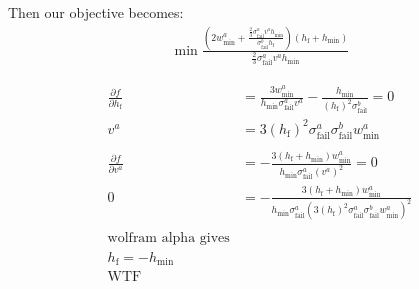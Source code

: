 \newpage
Then our objective becomes:
\begin{align*}
	\min{ \frac{\left( 2 w_\text{min}^a + \frac{\frac23 \sigma^a_\text{fail}v^a h_\text{min}}{\sigma^b_\text{fail}  h_\text{f}} \right) \left( h_\text{f} + h_\text{min} \right) }{ \frac23 \sigma^a_\text{fail}v^a h_\text{min} } }
\end{align*}

\begin{align*}
	\frac{\partial f}{\partial h_\text{f}} &= \frac{3 w_\text{min}^a}{h_\text{min} \sigma_\text{fail}^a v^a} - \frac{h_\text{min}}{\left(h_\text{f}\right)^2 \sigma_\text{fail}^b} = 0 \\
	v^a &= 3 \left(h_\text{f}\right)^2 \sigma_\text{fail}^a \sigma_\text{fail}^b  w_\text{min}^a  \\
	\\
	\frac{\partial f}{\partial v^a} &= - \frac{3 \left(h_\text{f} + h_\text{min}\right) w_\text{min}^a}{h_\text{min} \sigma^a_\text{fail} \left(v^a\right)^2} = 0\\
	0 &= - \frac{3 \left(h_\text{f} + h_\text{min}\right) w_\text{min}^a}{h_\text{min} \sigma^a_\text{fail} \left(  3 \left(h_\text{f}\right)^2 \sigma_\text{fail}^a \sigma_\text{fail}^b  w_\text{min}^a  \right)^2} \\
	\\
	\text{wolfram alpha gives} \\
	h_\text{f} = - h_\text{min} \\
	\text{WTF}
\end{align*}


